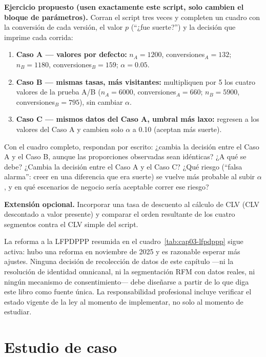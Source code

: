 \begin{cajaLaboratorio}
\textbf{Ejercicio propuesto (usen exactamente este script, solo cambien el
bloque de parámetros).} Corran el script tres veces y completen un cuadro
con la conversión de cada versión, el valor $p$ (\enquote{¿fue suerte?}) y la
decisión que imprime cada corrida:
\begin{enumerate}
  \item \textbf{Caso A — valores por defecto:} $n_A=1200$, conversiones$_A=132$;
  $n_B=1180$, conversiones$_B=159$; $\alpha=0.05$.
  \item \textbf{Caso B — mismas tasas, más visitantes:} multipliquen por 5 los
  cuatro valores de la prueba A/B ($n_A=6000$, conversiones$_A=660$;
  $n_B=5900$, conversiones$_B=795$), sin cambiar $\alpha$.
  \item \textbf{Caso C — mismos datos del Caso A, umbral más laxo:}
  regresen a los valores del Caso A y cambien solo $\alpha$ a 0.10 (aceptan
  más suerte).
\end{enumerate}
Con el cuadro completo, respondan por escrito: ¿cambia la decisión entre el
Caso A y el Caso B, aunque las proporciones observadas sean idénticas? ¿A
qué se debe? ¿Cambia la decisión entre el Caso A y el Caso C? ¿Qué riesgo
(\enquote{falsa alarma}: creer en una diferencia que era suerte) se vuelve más
probable al subir $\alpha$, y en qué escenarios de negocio sería aceptable
correr ese riesgo?

\textbf{Extensión opcional.} Incorporar una tasa de descuento al cálculo de
CLV (CLV descontado a valor presente) y comparar el orden resultante de los
cuatro segmentos contra el CLV simple del script.
\end{cajaLaboratorio}

\begin{cajaEtica}
La reforma a la LFPDPPP resumida en el cuadro~\ref{tab:cap03-lfpdppp} sigue
activa: hubo una reforma en noviembre de 2025 y es razonable esperar más
ajustes. Ninguna decisión de recolección de datos de este capítulo —ni la
resolución de identidad omnicanal, ni la segmentación RFM con datos reales,
ni ningún mecanismo de consentimiento— debe diseñarse a partir de lo que
diga este libro como fuente única. La responsabilidad profesional incluye
verificar el estado vigente de la ley al momento de implementar, no solo al
momento de estudiar.
\end{cajaEtica}

\section{Estudio de caso}

